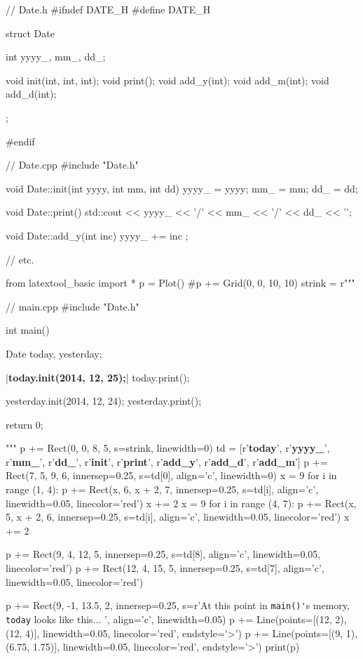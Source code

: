 \begin{consolethree}[escapeinside=||]
// Date.h
#ifndef DATE_H
#define DATE_H

struct Date
{
    int yyyy_, mm_, dd_;

    void init(int, int, int);
    void print();
    void add_y(int);
    void add_m(int);
    void add_d(int);
};

#endif
\end{consolethree}

\begin{consolethree}[escapeinside=||]
// Date.cpp
#include "Date.h"

void Date::init(int yyyy, int mm, int dd)
{
    yyyy_ = yyyy;
    mm_ = mm;
    dd_ = dd;
}

void Date::print()
{
    std::cout << yyyy_ << '/'
              << mm_ << '/'
              << dd_ << '\n';
}

void Date::add_y(int inc)
{
    yyyy_ += inc ;
}

// etc.
\end{consolethree}

\begin{python}
from latextool_basic import *
p = Plot()
#p += Grid(0, 0, 10, 10)
strink = r"""
\begin{consolethree}[escapeinside=||]
// main.cpp
#include "Date.h"

int main()
{
    Date today, yesterday;

    |\textbf{today.init(2014, 12, 25);}|
    today.print();
    
    yesterday.init(2014, 12, 24);
    yesterday.print();

    return 0;
}
\end{consolethree}
"""
p += Rect(0, 0, 8, 5, s=strink, linewidth=0)
td = [r'\textbf{today}', r'\textbf{yyyy\_}', r'\textbf{mm\_}', r'\textbf{dd\_}', r'\textbf{init}', r'\textbf{print}', r'\textbf{add\_y}', r'\textbf{add\_d}', r'\textbf{add\_m}']
p += Rect(7, 5, 9, 6, innersep=0.25, s=td[0], align='c', linewidth=0)
x = 9
for i in range (1, 4):
      p += Rect(x, 6, x + 2, 7, innersep=0.25, s=td[i], align='c', linewidth=0.05, linecolor='red')
      x += 2
x = 9
for i in range (4, 7):
      p += Rect(x, 5, x + 2, 6, innersep=0.25, s=td[i], align='c', linewidth=0.05, linecolor='red')
      x += 2

p += Rect(9, 4, 12, 5, innersep=0.25, s=td[8], align='c', linewidth=0.05, linecolor='red')
p += Rect(12, 4, 15, 5, innersep=0.25, s=td[7], align='c', linewidth=0.05, linecolor='red')

p += Rect(9, -1, 13.5, 2, innersep=0.25, s=r'At this point in \texttt{main()\'}s memory, \texttt{today} looks like this... ', align='c', linewidth=0.05)
p += Line(points=[(12, 2), (12, 4)], linewidth=0.05, linecolor='red', endstyle='>')
p += Line(points=[(9, 1), (6.75, 1.75)], linewidth=0.05, linecolor='red', endstyle='>')
print(p)
\end{python}

